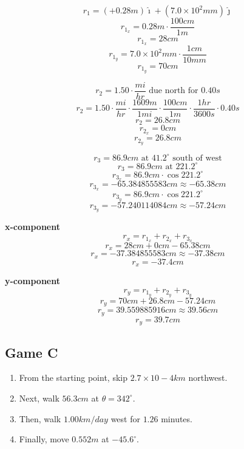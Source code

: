 \documentclass[11pt, letterpaper, includehead]{article}
\begin{document}
\begin{multicols}{2}
  $$r_1 = (+0.28m)\hat\imath +(7.0\times10^2mm)\hat\jmath$$
  $$r_{1_x} = 0.28m\cdot\frac{100cm}{1m}$$
  $$r_{1_x} = 28cm$$
  $$r_{1_y} = 7.0\times10^2mm\cdot\frac{1cm}{10mm}$$
  $$r_{1_y} = 70cm$$

  \columnbreak
  $$r_2 = 1.50\cdot\frac{mi}{hr} \text{ due north for }0.40s$$
  $$r_2 = 1.50\cdot\frac{mi}{hr}\cdot\frac{1609m}{1mi}\cdot\frac{100cm}{1m}\cdot\frac{1hr}{3600s}\cdot0.40s$$
  $$r_2 = 26.8cm$$
  $$r_{2_x} = 0cm$$
  $$r_{2_y} = 26.8cm$$
\end{multicols}

\hspace{0.5cm}

$$r_3 = 86.9cm \text{ at } 41.2^{\circ} \text{ south of west}$$
$$r_3 = 86.9cm \text{ at } 221.2^{\circ}$$
$$r_{3_x} = 86.9cm\cdot\cos221.2^{\circ}$$
$$r_{3_x} = -65.384855583cm \approx -65.38cm$$
$$r_{3_y} = 86.9cm\cdot\cos221.2^{\circ}$$
$$r_{3_y} = -57.240114084cm \approx -57.24cm$$

\hspace{0.5cm}

\begin{multicols}{2}
  \centering\textbf{x-component}
  $$r_x = r_{1_x} + r_{2_x} + r_{3_x}$$
  $$r_x = 28cm + 0cm -65.38cm$$
  $$r_x = -37.384855583cm \approx -37.38cm$$
  $$\boxed{r_x = -37.4cm}$$

  \centering\textbf{y-component}
  $$r_y = r_{1_y} + r_{2_y} + r_{3_y}$$
  $$r_y = 70cm + 26.8cm - 57.24cm$$
  $$r_y = 39.559885916cm \approx 39.56cm$$
  $$\boxed{r_y = 39.7cm} $$
\end{multicols}

\pagebreak
\subsection{Game C} %
\begin{enumerate}
  \item From the starting point, skip $2.7 \times 10-4 km$ northwest.
  \item Next, walk $56.3 cm$ at $\theta = 342^{\circ}$.
  \item Then, walk $1.00 km/day$ west for $1.26$ minutes.
  \item Finally, move $0.552 m$ at $-45.6^{\circ}$.
\end{enumerate}
\end{document}
